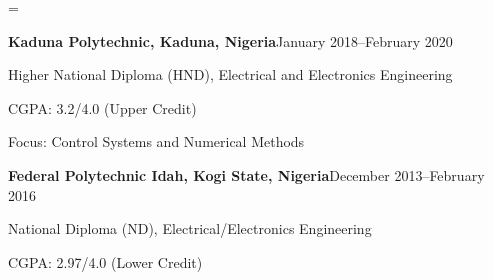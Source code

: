 \documentclass[11pt,letterpaper]{article}
\newlength{\cvindent}
\newcommand{\cvsection}[1]{%
  \par\addvspace{6.5pt}%
  \noindent\hspace*{-\cvindent}%
  \makebox[\cvindent][l]{\smash{\parbox[t]{\cvindent}{\raggedright\bfseries #1}}}%
  \ignorespaces}
\newcommand{\entrygap}{\par\vspace{3pt}}
\newcommand{\dated}[2]{\textbf{#1}\hfill #2\par}
\begin{document}
\raggedbottom

\hspace*{10pt}{\LARGE\bfseries Godwin Abuh Faruna}\par\vspace{3pt}
\noindent\hspace*{10pt}\par
\noindent\hspace*{10pt}\par
\vspace{1pt}

\leftskip=\cvindent

\cvsection{Education}%
\dated{Kaduna Polytechnic, Kaduna, Nigeria}{January 2018--February 2020}
Higher National Diploma (HND), Electrical and Electronics Engineering\par
CGPA: 3.2/4.0 (Upper Credit)\par
Focus: Control Systems and Numerical Methods
\entrygap
\dated{Federal Polytechnic Idah, Kogi State, Nigeria}{December 2013--February 2016}
National Diploma (ND), Electrical/Electronics Engineering\par
CGPA: 2.97/4.0 (Lower Credit)
\end{document}
